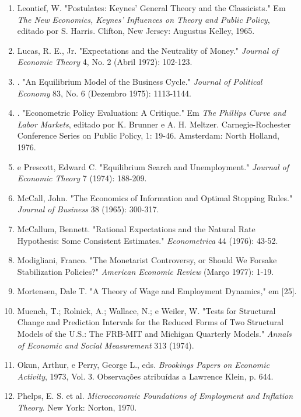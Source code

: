 \documentclass[12pt]{article}
\begin{document}
\begin{enumerate}
    \item[{[14]}] Leontief, W. "Postulates: Keynes' General Theory and the Classicists." Em \textit{The New Economics, Keynes' Influences on Theory and Public Policy}, editado por S. Harris. Clifton, New Jersey: Augustus Kelley, 1965.
    \item[{[15]}] Lucas, R. E., Jr. "Expectations and the Neutrality of Money." \textit{Journal of Economic Theory} 4, No. 2 (Abril 1972): 102-123.
    \item[{[16]}] \underline{\hspace{1cm}}. "An Equilibrium Model of the Business Cycle." \textit{Journal of Political Economy} 83, No. 6 (Dezembro 1975): 1113-1144.
    \item[{[17]}] \underline{\hspace{1cm}}. "Econometric Policy Evaluation: A Critique." Em \textit{The Phillips Curve and Labor Markets}, editado por K. Brunner e A. H. Meltzer. Carnegie-Rochester Conference Series on Public Policy, 1: 19-46. Amsterdam: North Holland, 1976.
    \item[{[18]}] \underline{\hspace{1cm}} e Prescott, Edward C. "Equilibrium Search and Unemployment." \textit{Journal of Economic Theory} 7 (1974): 188-209.
    \item[{[19]}] McCall, John. "The Economics of Information and Optimal Stopping Rules." \textit{Journal of Business} 38 (1965): 300-317.
    \item[{[20]}] McCallum, Bennett. "Rational Expectations and the Natural Rate Hypothesis: Some Consistent Estimates." \textit{Econometrica} 44 (1976): 43-52.
    \item[{[21]}] Modigliani, Franco. "The Monetarist Controversy, or Should We Forsake Stabilization Policies?" \textit{American Economic Review} (Março 1977): 1-19.
    \item[{[22]}] Mortensen, Dale T. "A Theory of Wage and Employment Dynamics," em [25].
    \item[{[23]}] Muench, T.; Rolnick, A.; Wallace, N.; e Weiler, W. "Tests for Structural Change and Prediction Intervals for the Reduced Forms of Two Structural Models of the U.S.: The FRB-MIT and Michigan Quarterly Models." \textit{Annals of Economic and Social Measurement} 313 (1974).
    \item[{[24]}] Okun, Arthur, e Perry, George L., eds. \textit{Brookings Papers on Economic Activity}, 1973, Vol. 3. Observações atribuídas a Lawrence Klein, p. 644.
    \item[{[25]}] Phelps, E. S. et al. \textit{Microeconomic Foundations of Employment and Inflation Theory}. New York: Norton, 1970.

\end{enumerate}
\end{document}

